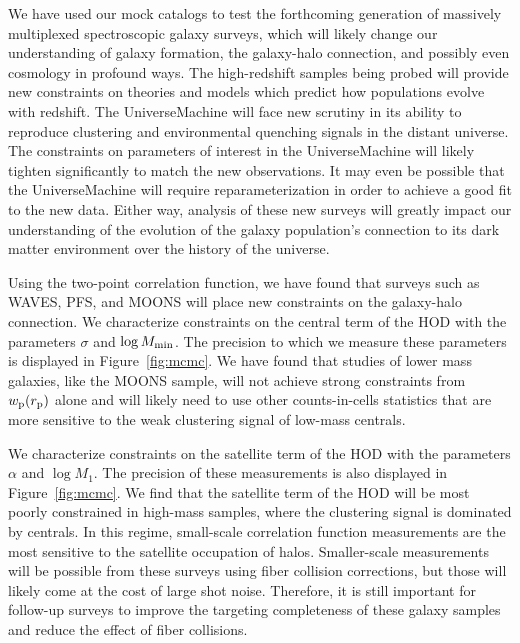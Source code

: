 \documentclass[twocolumn,twocolappendix]{aastex63}
\begin{document}
We have used our mock catalogs to test the forthcoming generation of massively multiplexed spectroscopic galaxy surveys, which will likely change our understanding of galaxy formation, the galaxy-halo connection, and possibly even cosmology in profound ways. The high-redshift samples being probed will provide new constraints on theories and models which predict how populations evolve with redshift. The UniverseMachine will face new scrutiny in its ability to reproduce clustering and environmental quenching signals in the distant universe. The constraints on parameters of interest in the UniverseMachine will likely tighten significantly to match the new observations. It may even be possible that the UniverseMachine will require reparameterization in order to achieve a good fit to the new data. Either way, analysis of these new surveys will greatly impact our understanding of the evolution of the galaxy population's connection to its dark matter environment over the history of the universe.

Using the two-point correlation function, we have found that surveys such as WAVES, PFS, and MOONS will place new constraints on the galaxy-halo connection. We characterize constraints on the central term of the HOD with the parameters $\sigma$ and $\log M_{\rm min}$. The precision to which we measure these parameters is displayed in Figure~\ref{fig:mcmc}. We have found that studies of lower mass galaxies, like the MOONS sample, will not achieve strong constraints from $w_{\rm p}(r_{\rm p})$ alone and will likely need to use other counts-in-cells statistics that are more sensitive to the weak clustering signal of low-mass centrals.

We characterize constraints on the satellite term of the HOD with the parameters $\alpha$ and $\log M_1$. The precision of these measurements is also displayed in Figure~\ref{fig:mcmc}. We find that the satellite term of the HOD will be most poorly constrained in high-mass samples, where the clustering signal is dominated by centrals. In this regime, small-scale correlation function measurements are the most sensitive to the satellite occupation of halos. Smaller-scale measurements will be possible from these surveys using fiber collision corrections, but those will likely come at the cost of large shot noise. Therefore, it is still important for follow-up surveys to improve the {targeting} completeness of these galaxy samples and reduce the effect of fiber collisions.
\end{document}
